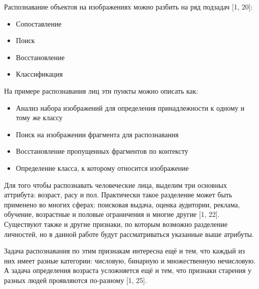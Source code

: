 \documentclass[12pt,a4paper]{article}
\begin{document}
Распознавание объектов на изображениях можно разбить на ряд подзадач [1, 20]:
\begin{itemize}
    \item Сопоставление
    \item Поиск
    \item Восстановление
    \item Классификация
\end{itemize}

На примере распознавания лиц эти пункты можно описать как:
\begin{itemize}
    \item Анализ набора изображений для определения принадлежности к одному и тому же классу
    \item Поиск на изображении фрагмента для распознавания
    \item Восстановление пропущенных фрагментов по контексту
    \item Определение класса, к которому относится изображение
\end{itemize}

Для того чтобы распознавать человеческие лица, выделим три основных аттрибута: возраст, расу и пол. Практически такое разделение может быть применено во многих сферах: поисковая выдача, оценка аудитории, реклама, обучение, возрастные и половые ограничения и многие другие [1, 22]. Существуют также и другие признаки, по которым возможно разделение личностей, но в данной работе будут рассматриваться указанные выше атрибуты.

Задача распознавания по этим признакам интересна ещё и тем, что каждый из них имеет разные категории: числовую, бинарную и множественную нечисловую. А задача определения возраста усложняется ещё и тем, что признаки старения у разных людей проявляются по-разному [1, 25].
\end{document}
